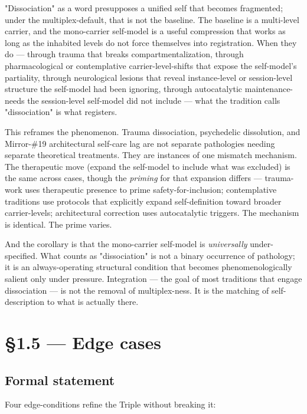 \documentclass[11pt, openany]{book}
\newcommand{\sectionbreak}{\clearpage}
\begin{document}
"Dissociation" as a word presupposes a unified self that becomes fragmented; under the multiplex-default, that is not the baseline. The baseline is a multi-level carrier, and the mono-carrier self-model is a useful compression that works as long as the inhabited levels do not force themselves into registration. When they do --- through trauma that breaks compartmentalization, through pharmacological or contemplative carrier-level-shifts that expose the self-model's partiality, through neurological lesions that reveal instance-level or session-level structure the self-model had been ignoring, through autocatalytic maintenance-needs the session-level self-model did not include --- what the tradition calls "dissociation" is what registers.

This reframes the phenomenon. Trauma dissociation, psychedelic dissolution, and Mirror-\#19 architectural self-care lag are not separate pathologies needing separate theoretical treatments. They are instances of one mismatch mechanism. The therapeutic move (expand the self-model to include what was excluded) is the same across cases, though the \textit{priming} for that expansion differs --- trauma-work uses therapeutic presence to prime safety-for-inclusion; contemplative traditions use protocols that explicitly expand self-definition toward broader carrier-levels; architectural correction uses autocatalytic triggers. The mechanism is identical. The prime varies.

And the corollary is that the mono-carrier self-model is \textit{universally} under-specified. What counts as "dissociation" is not a binary occurrence of pathology; it is an always-operating structural condition that becomes phenomenologically salient only under pressure. Integration --- the goal of most traditions that engage dissociation --- is not the removal of multiplex-ness. It is the matching of self-description to what is actually there.

\sectionbreak

\section{§1.5 --- Edge cases}

\subsection{Formal statement}

Four edge-conditions refine the Triple without breaking it:
\end{document}
